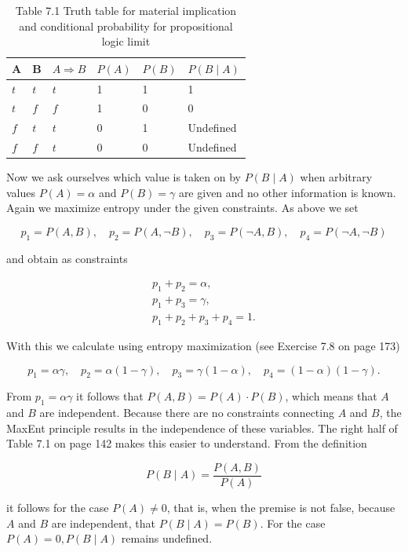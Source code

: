 \documentclass[10pt]{book}
\begin{document}
\begin{table}[htbp]
\begin{center}
\captionsetup{labelformat=empty}
\caption{Table 7.1 Truth table for material implication and conditional probability for propositional logic limit}
\begin{tabular}{|l|l|l|l|l|l|}
\hline
A & B & $A \Rightarrow B$ & $P(A)$ & $P(B)$ & $P(B \mid A)$ \\
\hline
$t$ & $t$ & $t$ & 1 & 1 & 1 \\
\hline
$t$ & $f$ & $f$ & 1 & 0 & 0 \\
\hline
$f$ & $t$ & $t$ & 0 & 1 & Undefined \\
\hline
$f$ & $f$ & $t$ & 0 & 0 & Undefined \\
\hline
\end{tabular}
\end{center}
\end{table}

Now we ask ourselves which value is taken on by $P(B \mid A)$ when arbitrary values $P(A)=\alpha$ and $P(B)=\gamma$ are given and no other information is known. Again we maximize entropy under the given constraints. As above we set

$$
p_{1}=P(A, B), \quad p_{2}=P(A, \neg B), \quad p_{3}=P(\neg A, B), \quad p_{4}=P(\neg A, \neg B)
$$

and obtain as constraints


\begin{gather*}
p_{1}+p_{2}=\alpha,  \tag{7.10}\\
p_{1}+p_{3}=\gamma,  \tag{7.11}\\
p_{1}+p_{2}+p_{3}+p_{4}=1 . \tag{7.12}
\end{gather*}


With this we calculate using entropy maximization (see Exercise 7.8 on page 173)

$$
p_{1}=\alpha \gamma, \quad p_{2}=\alpha(1-\gamma), \quad p_{3}=\gamma(1-\alpha), \quad p_{4}=(1-\alpha)(1-\gamma) .
$$

From $p_{1}=\alpha \gamma$ it follows that $P(A, B)=P(A) \cdot P(B)$, which means that $A$ and $B$ are independent. Because there are no constraints connecting $A$ and $B$, the MaxEnt principle results in the independence of these variables. The right half of Table 7.1 on page 142 makes this easier to understand. From the definition

$$
P(B \mid A)=\frac{P(A, B)}{P(A)}
$$

it follows for the case $P(A) \neq 0$, that is, when the premise is not false, because $A$ and $B$ are independent, that $P(B \mid A)=P(B)$. For the case $P(A)=0, P(B \mid A)$ remains undefined.
\end{document}
